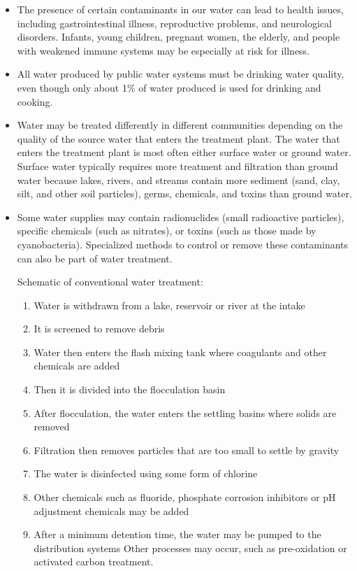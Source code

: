 \begin{itemize}
\item The presence of certain contaminants in our water can lead to health issues, including gastrointestinal illness, reproductive problems, and neurological disorders. Infants, young children, pregnant women, the elderly, and people with weakened immune systems may be especially at risk for illness.

\item All water produced by public water systems must be drinking water quality, even though only about 1\% of water produced is used for drinking and cooking.

\item Water may be treated differently in different communities depending on the quality of the source water that enters the treatment plant. The water that enters the treatment plant is most often either surface water or ground water. Surface water typically requires more treatment and filtration than ground water because lakes, rivers, and streams contain more sediment (sand, clay, silt, and other soil particles), germs, chemicals, and toxins than ground water.

\item Some water supplies may contain radionuclides (small radioactive particles), specific chemicals (such as nitrates), or toxins (such as those made by cyanobacteria). Specialized methods to control or remove these contaminants can also be part of water treatment.

Schematic of conventional water treatment:
\begin{enumerate}
\item Water is withdrawn from a lake, reservoir or river at the intake
\item It is screened to remove debris
\item Water then enters the flash mixing tank where coagulants and other chemicals are added
\item Then it is divided into the flocculation basin
\item After flocculation, the water enters the settling basins where solids are removed
\item Filtration then removes particles that are too small to settle by gravity
\item The water is disinfected using some form of chlorine
\item Other chemicals such as fluoride, phosphate corrosion inhibitors or pH adjustment chemicals may be added
\item After a minimum detention time, the water may be pumped to the distribution systems Other processes may occur, such as pre-oxidation or activated carbon treatment.
\end{enumerate}


\end{itemize}
